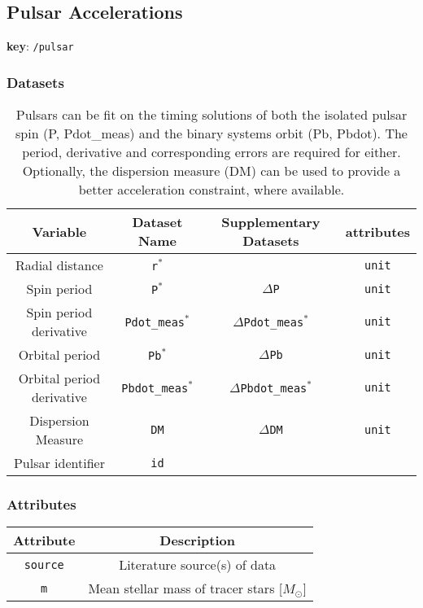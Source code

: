 \subsection{Pulsar Accelerations}

\textbf{key}: \texttt{/pulsar}

\subsubsection{Datasets}

\begin{center}
\begin{table}[H]
\begin{tabular}{ | c | c | c | c | }
    \hline
    Variable & Dataset Name & Supplementary Datasets &  attributes \\
    \hline\hline
    Radial distance & \texttt{r\(^*\)} & & \texttt{unit} \\
    \hline
    Spin period & \texttt{P\(^*\)} & \texttt{\(\Delta\)P} & \texttt{unit}\\
    \hline
    Spin period derivative & \texttt{Pdot\_meas\(^*\)} &
    \texttt{\(\Delta\)Pdot\_meas\(^*\)} & \texttt{unit} \\
    \hline
    Orbital period & \texttt{Pb\(^*\)} & \texttt{\(\Delta\)Pb} & \texttt{unit}\\
    \hline
    Orbital period derivative & \texttt{Pbdot\_meas\(^*\)} &
    \texttt{\(\Delta\)Pbdot\_meas\(^*\)} & \texttt{unit} \\
    \hline
    Dispersion Measure & \texttt{DM} & \texttt{\(\Delta\)DM} & \texttt{unit} \\
    \hline
    Pulsar identifier & \texttt{id} & & \\
    \hline
\end{tabular}
\caption*{
    Pulsars can be fit on the timing solutions of both the isolated
    pulsar spin (P, Pdot\_meas) and the binary systems orbit (Pb, Pbdot).
    The period, derivative and corresponding errors are required for either.
    Optionally, the dispersion measure (DM) can be used to provide a better
    acceleration constraint, where available.
}
\end{table}
\end{center}

\subsubsection{Attributes}


\begin{center}
\begin{table}[H]
\begin{tabular}{ | c | c | }
    \hline
    Attribute & Description \\
    \hline\hline
    \texttt{source} & Literature source(s) of data \\
    \hline
    \texttt{m} & Mean stellar mass of tracer stars [\(M_\odot\)] \\
    \hline
\end{tabular}
\end{table}
\end{center}
